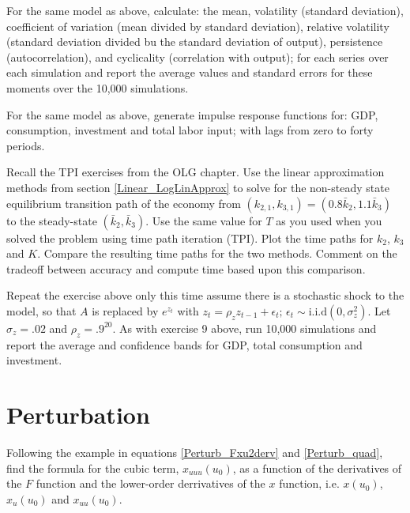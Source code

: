 \documentclass[letterpaper,11pt]{article}
\theoremstyle{definition}
\begin{document}
\begin{spacing}{1.5}
	\begin{Exercise} \label{Linear_HW_Base_Moments}
		For the same model as above, calculate: the mean, volatility (standard deviation), coefficient of variation (mean divided by standard deviation), relative volatility (standard deviation divided bu the standard deviation of output), persistence (autocorrelation), and cyclicality (correlation with output); for each series over each simulation and report the average values and standard errors for these moments over the 10,000 simulations.
	\end{Exercise}

	\begin{Exercise} \label{Linear_HW_Base_IRFs}
		For the same model as above, generate impulse response functions for: GDP, consumption, investment and total labor input; with lags from zero to forty periods.
	\end{Exercise}

	\begin{Exercise} \label{Linear_HW_OLG}
		Recall the TPI exercises from the OLG chapter.  Use the linear approximation methods from section \ref{Linear_LogLinApprox} to solve for the non-steady state equilibrium transition path of the economy from $(k_{2,1},k_{3,1})=(0.8\bar{k}_2,1.1\bar{k}_3)$ to the steady-state $(\bar{k}_2,\bar{k}_3)$. Use the same value for $T$ as you used when you solved the problem using time path iteration (TPI).  Plot the time paths for $k_2$, $k_3$ and $K$.  Compare the resulting time paths for the two methods.  Comment on the tradeoff between accuracy and compute time based upon this comparison.
	\end{Exercise}

	\begin{Exercise} \label{Linear_HW_OLG_Stoch}
		Repeat the exercise above only this time assume there is a stochastic shock to the model, so that $A$ is replaced by $e^{z_t}$ with $z_t = \rho_z z_{t-1} + \epsilon_t;\,\epsilon_t \sim \text{i.i.d} (0,\sigma_z^2)$.  Let $\sigma_z=.02$ and $\rho_z=.9^{20}$.  As with exercise 9 above, run 10,000 simulations and report the average and confidence bands for GDP, total consumption and investment.
	\end{Exercise}


\section*{Perturbation}\label{Perturb_HW}
\setcounter{Exercise}{0}
	\begin{Exercise} \label{Perturb_HW_Cubic}
		Following the example in equations \eqref{Perturb_Fxu2derv} and \eqref{Perturb_quad}, find the formula for the cubic term, $x_{uuu}(u_0)$, as a function of the derivatives of the $F$ function and the lower-order derrivatives of the $x$ function, i.e. $x(u_0)$, $x_u(u_0)$ and $x_{uu}(u_0)$.
	\end{Exercise}


\end{spacing}
\end{document}
